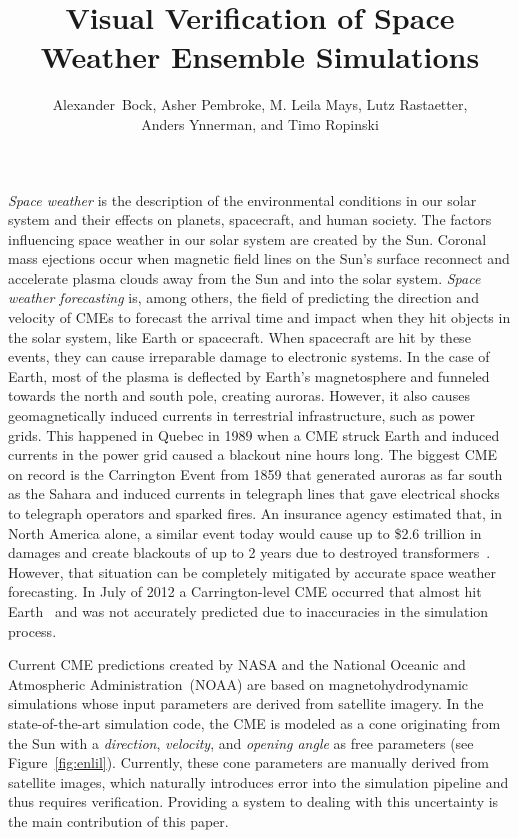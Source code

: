 \documentclass[journal]{vgtc}                %
\title{Visual Verification of Space Weather Ensemble Simulations}
\author{
    Alexander~Bock,
    Asher Pembroke,
    M. Leila Mays,
    Lutz Rastaetter,\\%
    Anders Ynnerman,
    and Timo Ropinski%
}
\begin{document}
\maketitle
\emph{Space weather} is the description of the environmental conditions in our solar system and their effects on planets, spacecraft, and human society. The factors influencing space weather in our solar system are created by the Sun. Coronal mass ejections occur when magnetic field lines on the Sun's surface reconnect and accelerate plasma clouds away from the Sun and into the solar system. \emph{Space weather forecasting} is, among others, the field of predicting the direction and velocity of CMEs to forecast the arrival time and impact when they hit objects in the solar system, like Earth or spacecraft. When spacecraft are hit by these events, they can cause irreparable damage to electronic systems. In the case of Earth, most of the plasma is deflected by Earth's magnetosphere and funneled towards the north and south pole, creating auroras. However, it also causes geomagnetically induced currents in terrestrial infrastructure, such as power grids. This happened in Quebec in 1989 when a CME struck Earth and induced currents in the power grid caused a blackout nine hours long. The biggest CME on record is the Carrington Event from 1859 that generated auroras as far south as the Sahara and induced currents in telegraph lines that gave electrical shocks to telegraph operators and sparked fires. An insurance agency estimated that, in North America alone, a similar event today would cause up to \$2.6 trillion in damages and create blackouts of up to 2 years due to destroyed transformers~\cite{lloyds2013impact}. However, that situation can be completely mitigated by accurate space weather forecasting. In July of 2012 a Carrington-level CME occurred that almost hit Earth~\cite{baker2013major} and was not accurately predicted due to inaccuracies in the simulation process.

Current CME predictions created by NASA and the National Oceanic and Atmospheric Administration~(NOAA) are based on magnetohydrodynamic simulations whose input parameters are derived from satellite imagery. In the state-of-the-art simulation code, the CME is modeled as a cone originating from the Sun with a \emph{direction}, \emph{velocity}, and \emph{opening angle} as free parameters (see Figure~\ref{fig:enlil}). Currently, these cone parameters are manually derived from satellite images, which naturally introduces error into the simulation pipeline and thus requires verification. Providing a system to dealing with this uncertainty is the main contribution of this paper.
\end{document}
